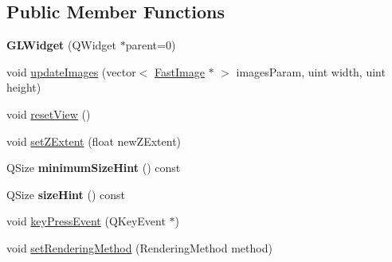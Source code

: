 \subsection*{Public Member Functions}
\begin{DoxyCompactItemize}
\item 
\hypertarget{class_g_l_widget_ab79c391c86de1ffb76f6950b49d82c0c}{
{\bfseries GLWidget} (QWidget $\ast$parent=0)}
\label{class_g_l_widget_ab79c391c86de1ffb76f6950b49d82c0c}

\item 
void \hyperlink{class_g_l_widget_a9601076e0757c5fe221e28d3e9983b75}{updateImages} (vector$<$ \hyperlink{class_fast_image}{FastImage} $\ast$ $>$ imagesParam, uint width, uint height)
\item 
void \hyperlink{class_g_l_widget_ae0cb1922c7f58b363fe4577a8a2c5d1e}{resetView} ()
\item 
void \hyperlink{class_g_l_widget_a68406450ab1961b48ebc786cb61b4d48}{setZExtent} (float newZExtent)
\item 
\hypertarget{class_g_l_widget_ade3142625c1bfda0576e419b176cf8b1}{
QSize {\bfseries minimumSizeHint} () const }
\label{class_g_l_widget_ade3142625c1bfda0576e419b176cf8b1}

\item 
\hypertarget{class_g_l_widget_a57698bc426052845b43a135a13540154}{
QSize {\bfseries sizeHint} () const }
\label{class_g_l_widget_a57698bc426052845b43a135a13540154}

\item 
void \hyperlink{class_g_l_widget_a35e6da60485a6b10fe24ac386b708071}{keyPressEvent} (QKeyEvent $\ast$)
\item 
void \hyperlink{class_g_l_widget_a91b951781d524f59eccae0296fa259d0}{setRenderingMethod} (RenderingMethod method)
\end{DoxyCompactItemize}
